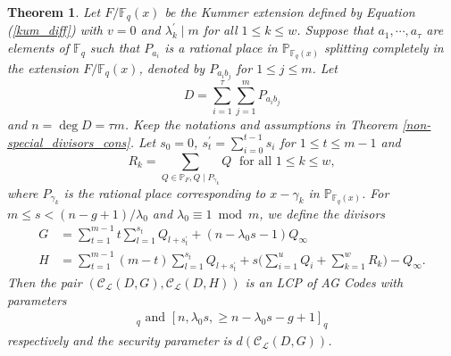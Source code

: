 \documentclass[journal,12pt,onecolumn]{IEEEtran}
\newtheorem{theorem}{Theorem}
\begin{document}
\begin{theorem}\label{con_v=0}
    Let $F/\mathbb{F}_q(x)$ be the Kummer extension defined by Equation (\ref{kum_diff}) with $v=0$ and $\lambda_k^\prime\mid m$ for all $1\le k\le w$. Suppose that $a_1,\cdots,a_\tau$ are elements of $\mathbb{F}_q$ such that $P_{a_i}$ is a rational place in $\mathbb{P}_{\mathbb{F}_q(x)}$ splitting completely in the extension $F/\mathbb{F}_q(x)$, denoted by $P_{a_ib_j}$ for $1\le j \le m$. Let
    \[
        D = \sum_{i=1}^\tau \sum_{j=1}^m P_{a_ib_j}
    \]
    and $n=\deg D=\tau m$. Keep the notations and assumptions in Theorem \ref{non-special_divisors_cons}. Let $s_0=0$, $s_t^\prime=\sum_{i=0}^{t-1}s_i$ for $1\le t\le m-1$ and 
    \[
        R_k = \sum_{Q\in\mathbb{P}_F,Q\mid P_{\gamma_k}} Q\; \text{ for all }1\le k\le w,
    \]
    where $P_{\gamma_k}$ is the rational place corresponding to $x-\gamma_k$ in $\mathbb{P}_{\mathbb{F}_q(x)}$. For $m\le s <(n-g+1)/\lambda_0$ and $\lambda_0 \equiv 1 \bmod m$, we define the divisors
    \begin{align*}
        G & = \sum_{t=1}^{m-1}t\sum_{l=1}^{s_t}Q_{l+s_t^\prime} + (n-\lambda_0s-1)Q_\infty\\
        H & = \sum_{t=1}^{m-1}(m-t)\sum_{l=1}^{s_t}Q_{l+s_t^\prime} +  s\bigg( \sum_{i=1}^uQ_i + \sum_{k=1}^wR_k \bigg)-Q_\infty. 
    \end{align*}
    Then the pair $(\mathcal{C}_{\mathcal{L}}(D,G),\mathcal{C}_{\mathcal{L}}(D,H))$ is an LCP of AG Codes with parameters
    \begin{gather*}
            [n,n-\lambda_0s,\ge \lambda_0s-g+1]_q\text{ and }[n,\lambda_0s,\ge n-\lambda_0s-g+1]_q
    \end{gather*}
    respectively and the security parameter is $d(\mathcal{C}_{\mathcal{L}}(D,G))$. 
\end{theorem}
\end{document}

